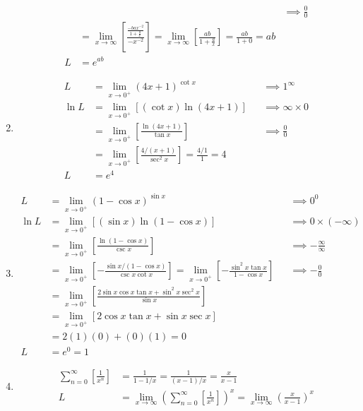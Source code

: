 \documentclass[12pt, A4]{report}
\begin{document}
\begin{enumerate}
\begin{align*}
								&&\implies \frac{0}{0} \\
							&= \lim_{x\to\infty}\left[\frac{\frac{-bax^{-2}}{1 + \frac{a}{x}}}{-x^{-2}}\right] 
								= \lim_{x\to\infty}\left[\frac{ab}{1 + \frac{a}{x}}\right] 
								= \frac{ab}{1 + 0} = ab \\
						L &= e^{ab}
					\end{align*}
				\item
					\begin{align*}
						L &= \lim_{x\to 0^+}(4x + 1)^{\cot x}
								&&\implies 1^{\infty} \\
						\ln L &= \lim_{x\to 0^+}[(\cot x)\ln(4x + 1)]
								&&\implies \infty \times 0 \\
							&= \lim_{x\to 0^+}\left[\frac{\ln(4x + 1)}{\tan x}\right]
								&&\implies \frac{0}{0} \\
							&= \lim_{x\to 0^+}\left[\frac{4/(x + 1)}{\sec^2 x}\right] 
								= \frac{4/1}{1} 
								= 4 \\
						L &= e^4
					\end{align*}
				\item
					\begin{align*}
						L &= \lim_{x\to 0^+}(1 - \cos x)^{\sin x}
								&&\implies 0^0 \\
						\ln L &= \lim_{x\to 0^+}\left[(\sin x)\ln(1 - \cos x)\right]
								&&\implies 0 \times (-\infty) \\
							&= \lim_{x\to 0^+}\left[\frac{\ln(1 - \cos x)}{\csc x}\right]
								&&\implies -\frac{\infty}{\infty} \\
							&= \lim_{x\to 0^+}\left[-\frac{\sin x /(1 - \cos x)}{\csc x \cot x}\right]
								= \lim_{x\to 0^+}\left[-\frac{\sin^2x\tan x}{1 - \cos x}\right]
								&&\implies -\frac{0}{0} \\
							&= \lim_{x\to 0^+}\left[\frac{2\sin x \cos x \tan x + \sin^2 x \sec^2 x}{\sin x}\right] \\\
							&= \lim_{x\to 0^+}[2\cos x \tan x + \sin x \sec x] \\
							&= 2(1)(0) + (0)(1) = 0 \\
						L &= e^0 = 1
					\end{align*}
				\item
					\begin{align*}
						\sum_{n = 0}^{\infty}\left[\frac{1}{x^n}\right] &= \frac{1}{1 - 1/x}
									= \frac{1}{(x - 1)/x}
									= \frac{x}{x - 1} \\
						L &= \lim_{x\to\infty}\left(\sum_{n = 0}^\infty\left[\frac{1}{x^n}\right]\right)^{x} = \lim_{x\to\infty}\left(\frac{x}{x - 1}\right)^x

\end{align*}
\end{enumerate}
\end{document}

